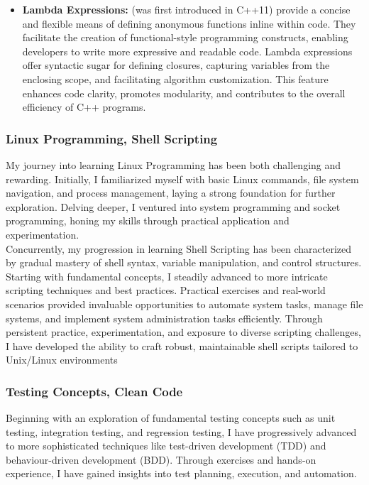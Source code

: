 \begin{itemize}
            \item \textbf{Lambda Expressions:} (was first introduced in C++11) provide a concise and flexible means of defining anonymous functions inline within code. They facilitate the creation of functional-style programming constructs, enabling developers to write more expressive and readable code. Lambda expressions offer syntactic sugar for defining closures, capturing variables from the enclosing scope, and facilitating algorithm customization. This feature enhances code clarity, promotes modularity, and contributes to the overall efficiency of C++ programs.
            
        \end{itemize}

    \subsubsection{Linux Programming, Shell Scripting}
    
    My journey into learning Linux Programming has been both challenging and rewarding. Initially, I familiarized myself with basic Linux commands, file system navigation, and process management, laying a strong foundation for further exploration. Delving deeper, I ventured into system programming and socket programming, honing my skills through practical application and experimentation. \\

    \noindent Concurrently, my progression in learning Shell Scripting has been characterized by gradual mastery of shell syntax, variable manipulation, and control structures. Starting with fundamental concepts, I steadily advanced to more intricate scripting techniques and best practices. Practical exercises and real-world scenarios provided invaluable opportunities to automate system tasks, manage file systems, and implement system administration tasks efficiently. Through persistent practice, experimentation, and exposure to diverse scripting challenges, I have developed the ability to craft robust, maintainable shell scripts tailored to Unix/Linux environments


    \subsubsection{Testing Concepts, Clean Code}
     Beginning with an exploration of fundamental testing concepts such as unit testing, integration testing, and regression testing, I have progressively advanced to more sophisticated techniques like test-driven development (TDD) and behaviour-driven development (BDD). Through exercises and hands-on experience, I have gained insights into test planning, execution, and automation. \\

